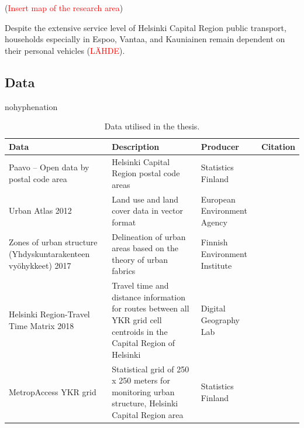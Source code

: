 (\textcolor{red}{Insert map of the research area})

Despite the extensive service level of Helsinki Capital Region public transport, households especially in Espoo, Vantaa, and Kauniainen remain dependent on their personal vehicles (\textcolor{red}{LÄHDE}). 

\subsection{Data}
\justify

\begin{hyphenrules}{nohyphenation}
    \begin{table}[H]
        \centering
        \caption{Data utilised in the thesis.} 
        \label{tab:useddata}
        \def\arraystretch{1.2} 
        \setlength\tabcolsep{1.2ex}
        \begin{tabular}{ @{} >{\raggedright\arraybackslash}p{4cm} >{\raggedright\arraybackslash}p{4.5cm} >{\raggedright\arraybackslash}p{3.5cm} >{\raggedleft\arraybackslash}p{2.5cm} @{} }
            \toprule
            Data & Description & Producer & Citation \\
            \midrule
            Paavo -- Open data by postal code area & Helsinki Capital Region postal code areas & Statistics Finland & \cite{StatisticsFinland2019a} \\
            Urban Atlas 2012 & Land use and land cover data in vector format & European Environment Agency & \cite{EuropeanEnvironmentAgency2016} \\
            Zones of urban structure (Yhdyskuntarakenteen vyöhykkeet) 2017 & Delineation of urban areas based on the theory of urban fabrics & Finnish Environment Institute & \cite{Ristimaki2017} \\
            Helsinki Region-Travel Time Matrix 2018 & Travel time and distance information for routes between all YKR grid cell centroids in the Capital Region of Helsinki & Digital Geography Lab & \cite{Tenkanen2018} \\
            MetropAccess YKR grid & Statistical grid of 250 x 250 meters for monitoring urban structure, Helsinki Capital Region area & Statistics Finland & \cite{StatisticsFinland2020} \\
            \bottomrule
        \end{tabular}
    \end{table} 
\end{hyphenrules}

